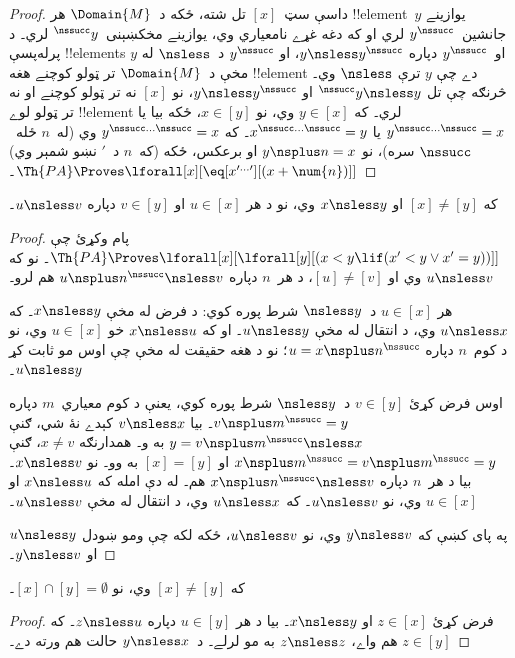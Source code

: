 \documentclass[../../../include/open-logic-section]{subfiles}
\begin{document}
\begin{proof}
داسې سټ~$[x]$ تل شته، ځکه د~$\Domain{M}$ هر !!{element}~$y$
يوازينے جانشين~$y^\nssucc$ لري او که دغه غړے نامعياري وي،
يوازينے مخکښېنی~$^\nssucc y$ لري۔ د پرله‌پسې !!{element}s $y$ او~$y^\nssucc$
دپاره $y\nsless y^\nssucc$، او $y^\nssucc$ د~$\nsless$ له مخې
د~$\Domain{M}$ تر ټولو کوچنے هغه !!{element} دے چې $y$ ترې
$\nsless$ وي۔ څرنګه چې تل
$^\nssucc y\nsless y$ او $y\nsless y^\nssucc$، نو $[x]$ نه تر ټولو
کوچنے او نه تر ټولو لوے !!{element} لري۔ که $y\in[x]$ وي، نو
$x\in[y]$، ځکه بيا يا $y^{\nssucc\dots\nssucc}=x$ يا
$x^{\nssucc\dots\nssucc}=y$۔ که
$y^{\nssucc\dots\nssucc}=x$ وي (له~$n$ ځله~$\nssucc$ سره)، نو
$y\nsplus n=x$ او برعکس، ځکه (که~$n$ د~$\prime$ نښو شمېر وي)
$\Th{PA} \Proves \lforall[x][\eq[x^{\prime\dots\prime}][(x +
    \num{n})]]$۔
\end{proof}

\begin{prop}
که $[x]\neq[y]$ او $x\nsless y$ وي، نو د هر $u\in[x]$ او
$v\in[y]$ دپاره $u\nsless v$۔
\end{prop}

\begin{proof}
پام وکړئ چې $\Th{PA} \Proves
\lforall[x][\lforall[y][(x < y \lif (x' < y \lor x' = y))]]$۔
نو که $u\nsless v$ وي او $[u]\neq[v]$، د هر~$n$ دپاره
$u\nsplus n^\nssucc\nsless v$ هم لرو۔

هر $u\in[x]$ د~$\nsless y$ شرط پوره کوي: د فرض له مخې $x\nsless y$۔ که
$u\nsless x$ وي، د انتقال له مخې $u\nsless y$۔ او که
$x\nsless u$ خو $u\in[x]$ وي، نو د کوم~$n$ دپاره
$u=x\nsplus n^\nssucc$؛ نو د هغه حقيقت له مخې چې اوس مو ثابت کړ
$u\nsless y$۔

اوس فرض کړئ $v\in[y]$ د~$\nsless y$ شرط پوره کوي، يعنې د کوم معياري~$m$
دپاره $v\nsplus m^\nssucc=y$۔ بيا $v\nsless x$ کېدے نۀ شي، ګنې
$y=v\nsplus m^\nssucc\nsless x$ به و۔ همدارنګه $x\neq v$، ګنې
$x\nsplus m^\nssucc=v\nsplus m^\nssucc=y$ او $[x]=[y]$ به وو۔
نو $x\nsless v$۔ بيا د هر~$n$ دپاره
$x\nsplus n^\nssucc\nsless v$ هم۔ له دې امله که $x\nsless u$ او
$u\in[x]$ وي، نو $u\nsless v$۔ که $u\nsless x$ وي، د انتقال له
مخې $u\nsless v$۔

په پای کښې که $y\nsless v$ وي، نو $u\nsless v$، ځکه لکه چې ومو
ښودل $u\nsless y$ او $y\nsless v$۔
\end{proof}

\begin{cor}
که $[x]\neq[y]$ وي، نو $[x]\cap[y]=\emptyset$۔
\end{cor}

\begin{proof}
فرض کړئ $z\in[x]$ او $x\nsless y$۔ بيا د هر $u\in[y]$ دپاره
$z\nsless u$۔ که $z\in[y]$ هم واے، $z\nsless z$ به مو لرلے۔
د~$y\nsless x$ حالت هم ورته دے۔
\end{proof}
\end{document}
